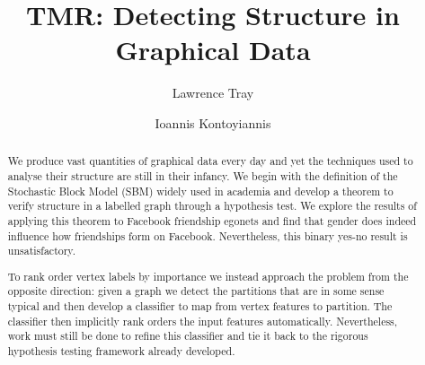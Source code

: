 \documentclass[11pt]{article}
\title{TMR: Detecting Structure in Graphical Data}
\author{Lawrence Tray \and Ioannis Kontoyiannis}
\begin{document}
\maketitle

\begin{abstract}
We produce vast quantities of graphical data every day and yet the techniques used to analyse their structure are still in their infancy. We begin with the definition of the Stochastic Block Model (SBM) widely used in academia and develop a theorem to verify structure in a labelled graph through a hypothesis test. We explore the results of applying this theorem to Facebook friendship egonets and find that gender does indeed influence how friendships form on Facebook. Nevertheless, this binary yes-no result is unsatisfactory.

To rank order vertex labels by importance we instead approach the problem from the opposite direction: given a graph we detect the partitions that are in some sense typical and then develop a classifier to map from vertex features to partition. The classifier then implicitly rank orders the input features automatically. Nevertheless, work must still be done to refine this classifier and tie it back to the rigorous hypothesis testing framework already developed.
\end{abstract}
\end{document}
